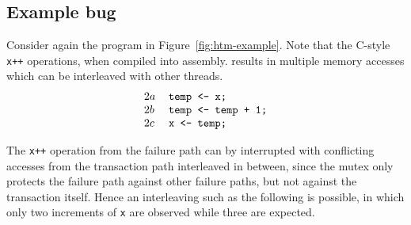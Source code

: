 \documentclass{article}
\begin{document}
\subsection{Example bug}
\label{sec:example}

\newcommand\tii{\ensuremath{\hilight{lavender}{\mathbf{Ti}}}\xspace}
\newcommand\tjj{\ensuremath{\hilight{seafoam}{\mathbf{Tj}}}\xspace}
\newcommand\tkk{\ensuremath{\hilight{salmon}{\mathbf{Tk}}}\xspace}

\newcommand\tiiat[1]{\ensuremath{\hilight{lavender}{\mathbf{Ti}@#1}}\xspace}
\newcommand\tjjat[1]{\ensuremath{\hilight{seafoam} {\mathbf{Tj}@#1}}\xspace}
\newcommand\tkkat[1]{\ensuremath{\hilight{salmon}  {\mathbf{Tk}@#1}}\xspace}

Consider again the program in Figure~\ref{fig:htm-example}.
Note that the C-style {\tt x++} operations, when compiled into assembly.
results in multiple memory accesses which can be interleaved with other threads.
\[
\begin{tabular}{ll}
	$2a$ & \texttt{temp <- x;} \\
	$2b$ & \texttt{temp <- temp + 1;} \\
	$2c$ & \texttt{x <- temp;} \\
\end{tabular}
\]

The {\tt x++} operation from the failure path
can by interrupted with conflicting accesses from the transaction path interleaved in between,
since the mutex only protects the failure path against other failure paths,
but not against the transaction itself.
Hence an interleaving such as the following is possible,
in which only two increments of {\tt x} are observed while three are expected.
\end{document}

